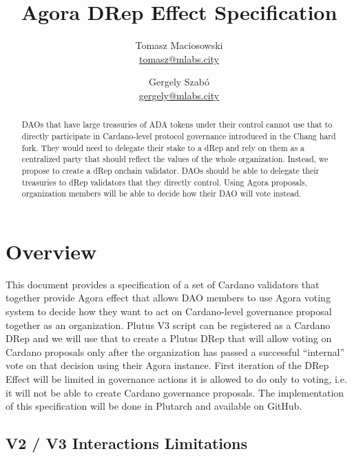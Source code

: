 \documentclass{article}
\begin{document}

\title{\textbf{Agora DRep Effect Specification}}
\author{
  Tomasz Maciosowski\\\href{mailto:tomasz@mlabs.city}{tomasz@mlabs.city} \and
  Gergely Szab\'o \\\href{mailto:gergely@mlabs.city}{gergely@mlabs.city}}
\date{}

\clearpage
\maketitle
\vskip 5mm
\begin{abstract}
  DAOs that have large treasuries of ADA tokens under their control cannot use that to directly participate in Cardano-level protocol governance introduced in the Chang hard fork.
  They would need to delegate their stake to a dRep and rely on them as a centralized party that should reflect the values of the whole organization.
  Instead, we propose to create a dRep onchain validator.
  DAOs should be able to delegate their treasuries to dRep validators that they directly control.
  Using Agora proposals, organization members will be able to decide how their DAO will vote instead.
\end{abstract}
\vskip 5mm

\newpage
\tableofcontents
\newpage
{}
\setcounter{page}{1}

\section{Overview}

This document provides a specification of a set of Cardano validators that together provide Agora effect that
allows DAO members to use Agora voting system to decide how they want to act on Cardano-level governance proposal together as an organization.
Plutus V3 script can be registered as a Cardano DRep and we will use that to create a Plutus DRep that will allow voting on Cardano proposals only after the organization has passed a successful ``internal'' vote on that decision using their Agora instance.
First iteration of the DRep Effect will be limited in governance actions it is allowed to do only to voting, i.e. it will not be able to create Cardano governance proposals.
The implementation of this specification will be done in Plutarch and available on GitHub.

\subsection{V2 / V3 Interactions Limitations}
\end{document}

